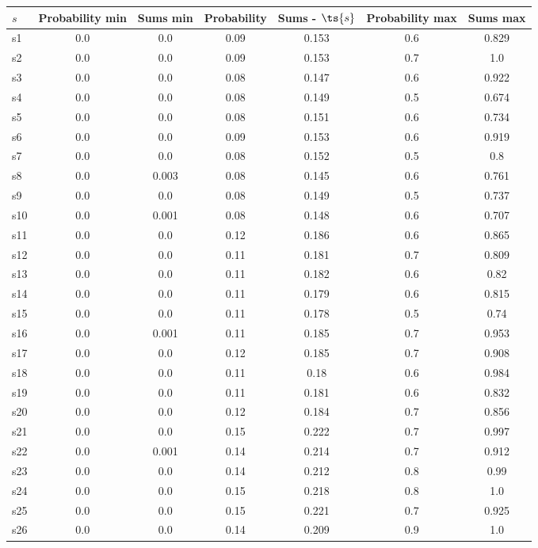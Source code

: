 \documentclass{article}
\begin{document}
\noindent\begin{tabular}{|l|c|c|c|c|c|c|}
\hline
$s$& Probability min & Sums min & Probability & Sums - $\ts{s}$ & Probability max & Sums max\\
\hline
s1 &0.0 & 0.0 & 0.09 & 0.153 & 0.6 & 0.829\\
\hline
s2 &0.0 & 0.0 & 0.09 & 0.153 & 0.7 & 1.0\\
\hline
s3 &0.0 & 0.0 & 0.08 & 0.147 & 0.6 & 0.922\\
\hline
s4 &0.0 & 0.0 & 0.08 & 0.149 & 0.5 & 0.674\\
\hline
s5 &0.0 & 0.0 & 0.08 & 0.151 & 0.6 & 0.734\\
\hline
s6 &0.0 & 0.0 & 0.09 & 0.153 & 0.6 & 0.919\\
\hline
s7 &0.0 & 0.0 & 0.08 & 0.152 & 0.5 & 0.8\\
\hline
s8 &0.0 & 0.003 & 0.08 & 0.145 & 0.6 & 0.761\\
\hline
s9 &0.0 & 0.0 & 0.08 & 0.149 & 0.5 & 0.737\\
\hline
s10 &0.0 & 0.001 & 0.08 & 0.148 & 0.6 & 0.707\\
\hline
s11 &0.0 & 0.0 & 0.12 & 0.186 & 0.6 & 0.865\\
\hline
s12 &0.0 & 0.0 & 0.11 & 0.181 & 0.7 & 0.809\\
\hline
s13 &0.0 & 0.0 & 0.11 & 0.182 & 0.6 & 0.82\\
\hline
s14 &0.0 & 0.0 & 0.11 & 0.179 & 0.6 & 0.815\\
\hline
s15 &0.0 & 0.0 & 0.11 & 0.178 & 0.5 & 0.74\\
\hline
s16 &0.0 & 0.001 & 0.11 & 0.185 & 0.7 & 0.953\\
\hline
s17 &0.0 & 0.0 & 0.12 & 0.185 & 0.7 & 0.908\\
\hline
s18 &0.0 & 0.0 & 0.11 & 0.18 & 0.6 & 0.984\\
\hline
s19 &0.0 & 0.0 & 0.11 & 0.181 & 0.6 & 0.832\\
\hline
s20 &0.0 & 0.0 & 0.12 & 0.184 & 0.7 & 0.856\\
\hline
s21 &0.0 & 0.0 & 0.15 & 0.222 & 0.7 & 0.997\\
\hline
s22 &0.0 & 0.001 & 0.14 & 0.214 & 0.7 & 0.912\\
\hline
s23 &0.0 & 0.0 & 0.14 & 0.212 & 0.8 & 0.99\\
\hline
s24 &0.0 & 0.0 & 0.15 & 0.218 & 0.8 & 1.0\\
\hline
s25 &0.0 & 0.0 & 0.15 & 0.221 & 0.7 & 0.925\\
\hline
s26 &0.0 & 0.0 & 0.14 & 0.209 & 0.9 & 1.0\\

\end{tabular}
\end{document}
